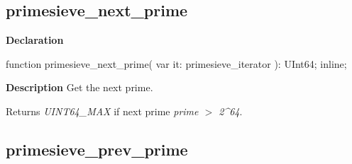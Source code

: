 \documentclass{report}
\newif\ifpdf
\begin{document}
\subsection*{primesieve{\_}next{\_}prime}
\fi
\label{primesieve-primesieve_next_prime}
\begin{list}{}{
\setlength{\itemindent}{0cm}
\setlength{\listparindent}{0cm}
\setlength{\leftmargin}{\evensidemargin}
\addtolength{\leftmargin}{\tmplength}
\settowidth{\labelsep}{X}
\addtolength{\leftmargin}{\labelsep}
\setlength{\labelwidth}{\tmplength}
}
\item[\textbf{Declaration}\hfill]
\ifpdf
\begin{flushleft}
\fi
\begin{ttfamily}
function primesieve{\_}next{\_}prime( var it: primesieve{\_}iterator ): UInt64; inline;\end{ttfamily}

\ifpdf
\end{flushleft}
\fi

\par
\item[\textbf{Description}]
Get the next prime.

Returns \textit{UINT64{\_}MAX} if next prime \textit{prime {$>$} 2{\^{}}64}.

\end{list}
\ifpdf
\subsection*{\large{\textbf{primesieve{\_}prev{\_}prime}}\normalsize\hspace{1ex}\hrulefill}
\else
\end{document}
